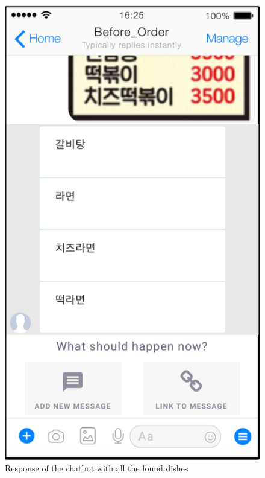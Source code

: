 \begin{figure}[htbp]
\centerline{\includegraphics[height=\custompicheight]{./pictures/facebook_response}}
\caption{Response of the chatbot with all the found dishes}
\label{fig:facebook_response}
\end{figure}
\FloatBarrier

